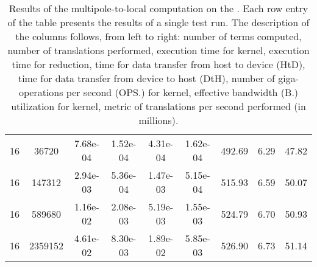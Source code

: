 \begin{table*}
\begin{tabular}{|c|c|c|c|c|c|c|c|c|}
\rowcolor[gray]{0.9} 16  &  36720  &  7.68e-04 &  1.52e-04 &  4.31e-04 &  1.62e-04 &  492.69 &  6.29 &  47.82  \\
\rowcolor[gray]{1.0} 16  &  147312  &  2.94e-03 &  5.36e-04 &  1.47e-03 &  5.15e-04 &  515.93 &  6.59 &  50.07  \\
\rowcolor[gray]{0.9} 16  &  589680  &  1.16e-02 &  2.08e-03 &  5.19e-03 &  1.55e-03 &  524.79 &  6.70 &  50.93  \\
\rowcolor[gray]{1.0} 16  &  2359152  &  4.61e-02 &  8.30e-03 &  1.89e-02 &  5.85e-03 &  526.90 &  6.73 &  51.14  \\
\hline
\end{tabular}
\caption{Results of the multipole-to-local computation on the {\NV} {\tesla} {\gpu}. Each row entry of the table presents
the results of a single test run. The description of the columns follows, from left to right:
number of terms computed, number of translations performed, {\gpu} execution time for {\ML} kernel,
{\gpu} execution time for reduction, time for data transfer from host to device (HtD), time for data transfer
from device to host (DtH), number of giga-operations per second (OPS.) for {\ML} kernel, effective bandwidth (B.)
utilization for {\ML} kernel, metric of {\ML} translations per second performed (in millions).}
\label{tab:m2ltesla}
\end{table*}
